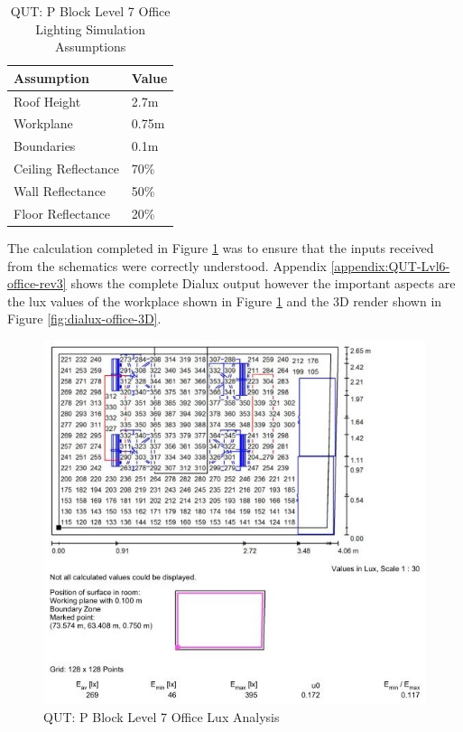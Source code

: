 \begin{table}[htb]
	\centering
	\renewcommand{\arraystretch}{1}
	\begin{tabular}{|l|l|}
		\hline
		\textbf{Assumption} & \textbf{Value} \\ \hline
		Roof Height         & 2.7m           \\ \hline
		Workplane           & 0.75m          \\ \hline
		Boundaries          & 0.1m           \\ \hline
		Ceiling Reflectance & 70\%           \\ \hline
		Wall Reflectance    & 50\%           \\ \hline
		Floor Reflectance   & 20\%           \\ \hline
	\end{tabular}
	\caption{QUT: P Block Level 7 Office Lighting Simulation Assumptions}
	\label{table:QUT-lvl6-office-assumptions}
\end{table} 

The calculation completed in Figure \ref{fig:dialux-office-workplane-summary} was to ensure that the inputs received from the schematics were correctly understood. Appendix \ref{appendix:QUT-Lvl6-office-rev3} shows the complete Dialux output however the important aspects are the lux values of the workplace shown in Figure \ref{fig:dialux-office-workplane-summary} and the 3D render shown in Figure \ref{fig:dialux-office-3D}.  

\begin{figure}[H]
	\hfill\includegraphics[width = 120mm]{images/project-model/dialux-office-workplane-summary}\hspace*{\fill}
	\caption{QUT: P Block Level 7 Office Lux Analysis} 
	\label{fig:dialux-office-workplane-summary}
\end{figure}

